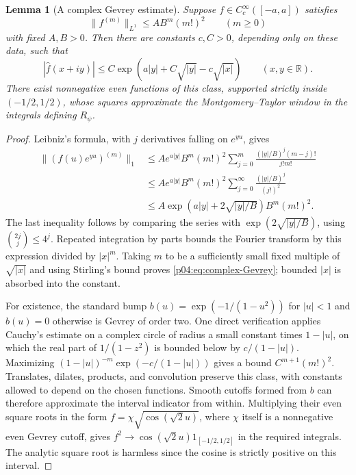 \documentclass[11pt,letterpaper]{article}
\newtheorem{lemma}[theorem]{Lemma}
\theoremstyle{definition}
\theoremstyle{remark}
\newcommand{\1}{\mathbf 1}
\begin{document}
\begin{lemma}[A complex Gevrey estimate]\label{p04:lem:complex-Gevrey}
Suppose $f\in C_c^\infty([-a,a])$ satisfies
\[
 \|f^{(m)}\|_{L^1}\le A B^m(m!)^2\qquad(m\ge0)
\]
with fixed $A,B>0$. Then there are constants $c,C>0$, depending
only on these data, such that
\begin{equation}\label{p04:eq:complex-Gevrey}
 |\widehat f(x+iy)|
 \le C\exp\left(a|y|+C\sqrt{|y|}-c\sqrt{|x|}\right)
       \qquad(x,y\in\mathbb R).
\end{equation}
There exist nonnegative even functions of this class, supported
strictly inside $(-1/2,1/2)$, whose squares approximate the
Montgomery--Taylor window in the integrals defining $R_\psi$.
\end{lemma}
\begin{proof}
Leibniz's formula, with $j$ derivatives falling on $e^{yu}$, gives
\begin{align*}
 \|(f(u)e^{yu})^{(m)}\|_1
 &\le A e^{a|y|} B^m(m!)^2
    \sum_{j=0}^m\frac{(|y|/B)^j(m-j)!}{j!m!}\\
 &\le A e^{a|y|} B^m(m!)^2
    \sum_{j=0}^\infty\frac{(|y|/B)^j}{(j!)^2}\\
 &\le A\exp\left(a|y|+2\sqrt{|y|/B}\right)B^m(m!)^2.
\end{align*}
The last inequality follows by comparing the series with
$\exp(2\sqrt{|y|/B})$, using
$\binom{2j}{j}\le4^j$. Repeated integration by parts bounds the
Fourier transform by this expression divided by $|x|^m$.
Taking $m$ to be a sufficiently small fixed multiple of $\sqrt{|x|}$
and using Stirling's bound proves \eqref{p04:eq:complex-Gevrey}; bounded
$|x|$ is absorbed into the constant.

For existence, the standard bump
$b(u)=\exp(-1/(1-u^2))$ for $|u|<1$ and $b(u)=0$ otherwise is
Gevrey of order two. One direct verification applies Cauchy's
estimate on a complex circle of radius a small constant times
$1-|u|$, on which the real part of $1/(1-z^2)$ is bounded below by
$c/(1-|u|)$. Maximizing
$(1-|u|)^{-m}\exp(-c/(1-|u|))$ gives a bound
$C^{m+1}(m!)^2$. Translates, dilates, products, and convolution
preserve this class, with constants allowed to depend on the chosen
functions. Smooth cutoffs formed from $b$ can therefore approximate
the interval indicator from within. Multiplying their even square
roots in the form $f=\chi\sqrt{\cos(\sqrt2u)}$, where
$\chi$ itself is a nonnegative even Gevrey cutoff, gives
$f^2\to\cos(\sqrt2u)1_{[-1/2,1/2]}$ in the required integrals.
The analytic square root is harmless since the cosine is strictly
positive on this interval.
\end{proof}
\end{document}
